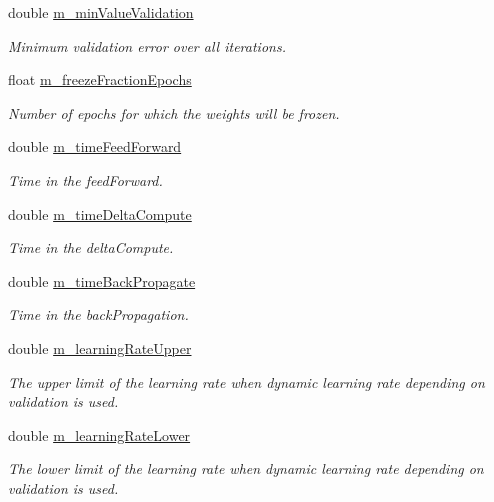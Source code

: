 \begin{DoxyCompactItemize}
double \hyperlink{classTrainingAlgorithm_a317c3e0ba32fa6984f8dece4bafa0ae6}{m\+\_\+min\+Value\+Validation}
\begin{DoxyCompactList}\small\item\em Minimum validation error over all iterations. \end{DoxyCompactList}\item 
float \hyperlink{classTrainingAlgorithm_a7d5e69b50a5321abc2c0f56b61d58732}{m\+\_\+freeze\+Fraction\+Epochs}
\begin{DoxyCompactList}\small\item\em Number of epochs for which the weights will be frozen. \end{DoxyCompactList}\item 
double \hyperlink{classTrainingAlgorithm_a5c1b96170a1ea80c6f717195dcfb88f1}{m\+\_\+time\+Feed\+Forward}
\begin{DoxyCompactList}\small\item\em Time in the feed\+Forward. \end{DoxyCompactList}\item 
double \hyperlink{classTrainingAlgorithm_aac9f0a53ea2677e3796af8b32d701b83}{m\+\_\+time\+Delta\+Compute}
\begin{DoxyCompactList}\small\item\em Time in the delta\+Compute. \end{DoxyCompactList}\item 
double \hyperlink{classTrainingAlgorithm_a38a66c5c61c0f060572c966e88827f48}{m\+\_\+time\+Back\+Propagate}
\begin{DoxyCompactList}\small\item\em Time in the back\+Propagation. \end{DoxyCompactList}\item 
double \hyperlink{classTrainingAlgorithm_a420db73ebb56b3c910a3117f91a7e5a0}{m\+\_\+learning\+Rate\+Upper}
\begin{DoxyCompactList}\small\item\em The upper limit of the learning rate when dynamic learning rate depending on validation is used. \end{DoxyCompactList}\item 
double \hyperlink{classTrainingAlgorithm_ac4432def3c47e16c1be6fd0a921b9fb0}{m\+\_\+learning\+Rate\+Lower}
\begin{DoxyCompactList}\small\item\em The lower limit of the learning rate when dynamic learning rate depending on validation is used. \end{DoxyCompactList}\item 

\end{DoxyCompactItemize}
